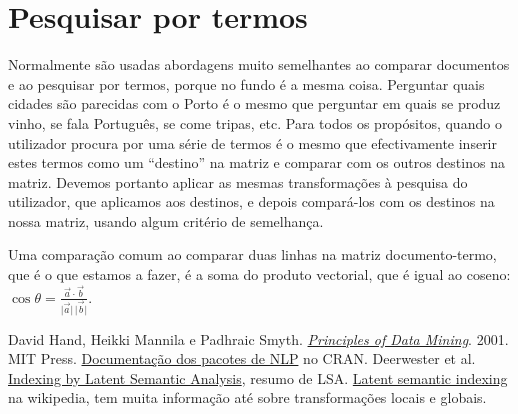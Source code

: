 \documentclass[twocolumn]{article}
\newcommand{\norm}[1]{\lvert #1 \rvert}
\begin{document}
\section{Pesquisar por termos}

Normalmente são usadas abordagens muito semelhantes ao comparar documentos e ao pesquisar por termos, porque no fundo é a mesma coisa. Perguntar quais cidades são parecidas com o Porto é o mesmo que perguntar em quais se produz vinho, se fala Português, se come tripas, etc. Para todos os propósitos, quando o utilizador procura por uma série de termos é o mesmo que efectivamente inserir estes termos como um ``destino'' na matriz e comparar com os outros destinos na matriz. Devemos portanto aplicar as mesmas transformações à pesquisa do utilizador, que aplicamos aos destinos, e depois compará-los com os destinos na nossa matriz, usando algum critério de semelhança.

Uma comparação comum ao comparar duas linhas na matriz documento-termo, que é o que estamos a fazer, é a soma do produto vectorial, que é igual ao coseno: $\cos \theta = \frac{\vec{a} \cdot \vec{b}}{\norm{\vec{a}} \, \norm{\vec{b}}}$.

\begin{thebibliography}{99}
 David Hand, Heikki Mannila e Padhraic Smyth. \href{ftp://gamma.sbin.org/pub/doc/books/Principles_of_Data_Mining.pdf}{\emph{Principles of Data Mining}}. 2001. MIT Press.
 \href{http://cran.r-project.org/web/views/NaturalLanguageProcessing.html
}{Documentação dos pacotes de NLP} no CRAN.
 Deerwester et al. \href{http://lsa.colorado.edu/papers/JASIS.lsi.90.pdf}{Indexing by Latent Semantic Analysis}, resumo de LSA.
 \href{http://en.wikibooks.org/wiki/LaTeX/Bibliography_Management}{Latent semantic indexing} na wikipedia, tem muita informação até sobre transformações locais e globais.
\end{thebibliography}
\end{document}
